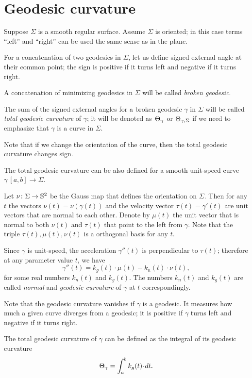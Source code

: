 \section{Geodesic curvature}

Suppose $\Sigma$ is a smooth regular surface.
Assume $\Sigma$ is oriented;
in this case terms ``left'' and ``right'' can be used the same sense as in the plane.

For a concatenation of two geodesics in $\Sigma$, let us define signed external angle at their common point;
the sign is positive if it turns left and negative if it turns right. 

A concatenation of minimizing geodesics in $\Sigma$ will be called \emph{broken geodesic}.

The sum of the signed external angles for a broken geodesic $\gamma$ in $\Sigma$ will be called \emph{total geodesic curvature} of $\gamma$; it will be denoted as~$\Theta_{\gamma}$ or $\Theta_{\gamma,\Sigma}$ if we need to emphasize that $\gamma$ is a curve in $\Sigma$.

Note that if we change the orientation of the curve, then the total geodesic curvature changes sign.

The total geodesic curvature can be also defined for a smooth unit-speed curve $\gamma\:[a,b]\to\Sigma$.

Let $\nu\colon\Sigma\to \mathbb{S}^2$ be the Gauss map that defines the orientation on $\Sigma$.
Then for any $t$ the vectors $\nu(t)=\nu(\gamma(t))$ and the velocity vector $\tau(t)=\gamma'(t)$ are unit vectors that are normal to each other.
Denote by $\mu(t)$ the unit vector that is normal to both $\nu(t)$ and $\tau(t)$ that point to the left from $\gamma$.
Note that the triple $\tau(t),\mu(t),\nu(t)$ is a orthogonal basis for any $t$.

Since $\gamma$ is unit-speed, the acceleration $\gamma''(t)$ is perpendicular to $\tau(t)$;
therefore at any parameter value $t$, we have
\[\gamma''(t)=k_g(t)\cdot \mu(t)-k_n(t)\cdot \nu(t),\]
for some real numbers $k_n(t)$ and $k_g(t)$.
The numbers $k_n(t)$ and $k_g(t)$ are called \emph{normal} and \emph{geodesic curvature} of $\gamma$ at $t$ correspondingly.

Note that the geodesic curvature vanishes if $\gamma$ is a geodesic. 
It measures how much a given curve diverges from a geodesic;
it is positive if $\gamma$ turns left and negative if it turns right.

The total geodesic curvature of $\gamma$ can be defined as the integral of its geodesic curvature
\[\tgc\gamma=\int_a^b k_g(t)\cdot dt.\]

